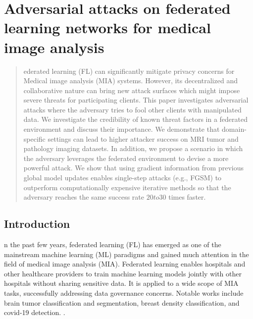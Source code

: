 \chapter{Adversarial attacks on federated learning networks
for medical image analysis}
\label{Bookchapter}

\begin{abstract}
ederated learning (FL) can significantly mitigate privacy concerns for Medical image analysis (MIA) systems. However, its decentralized and collaborative nature can bring new attack surfaces which might impose severe threats for participating clients.  
This paper investigates adversarial attacks where the adversary tries to fool other clients with manipulated data. 
We investigate the credibility of known threat factors in a federated environment and discuss their importance. We demonstrate that domain-specific settings can lead to higher attacker success on MRI tumor and pathology imaging datasets.
In addition, we propose a scenario in which the adversary leverages the federated environment to devise a more powerful attack. We show that using gradient information from previous global model updates enables single-step attacks (e.g., FGSM) to outperform computationally expensive iterative methods so that the adversary reaches the same success rate $20 to 30$ times faster.



\end{abstract}



\newpage







\section{Introduction}
n the past few years, federated learning (FL) has emerged as one of the mainstream machine learning (ML) paradigms and gained much attention in the field of medical image analysis (MIA). Federated learning enables hospitals and other healthcare providers to train machine learning models jointly with other hospitals without sharing sensitive data. It is applied to a wide scope of MIA tasks, successfully addressing data governance concerns. Notable works include brain tumor classification and segmentation, breast density classification, and covid-19 detection. \cite{sheller2020federated,dayan2021federated,rieke2020future}.



